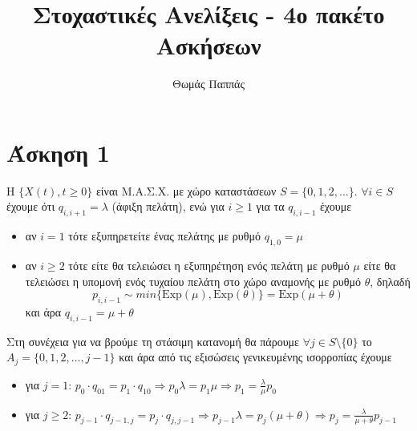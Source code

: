 \documentclass[a4paper,11pt]{article}
\newcommand{\Exp}{\mathrm{Exp}}
\newcommand{\mc}{Μ.Α.Σ.Χ. }
\begin{document}
\title{Στοχαστικές Ανελίξεις - 4ο πακέτο Ασκήσεων}
\author{Θωμάς Παππάς}
\date{}
\maketitle

\section*{Άσκηση 1}

Η $\{X(t),t\geq 0\}$ είναι \mc με χώρο καταστάσεων $S = \{0,1,2,\dots\}$.
$\forall i \in S$ έχουμε ότι $q_{i,i+1} = \lambda$ (άφιξη πελάτη), ενώ για $i \geq 1$ για τα $q_{i,i-1}$ έχουμε
\begin{itemize}
	\item αν $i=1$ τότε εξυπηρετείτε ένας πελάτης με ρυθμό $q_{1,0}=\mu$
	\item αν $i \geq 2$ τότε είτε θα τελειώσει η εξυπηρέτηση ενός πελάτη με ρυθμό $\mu$ είτε θα τελειώσει η υπομονή ενός τυχαίου πελάτη στο χώρο αναμονής με ρυθμό $\theta$, δηλαδή
	\[p_{i,i-1} \sim min\{\Exp(\mu), \Exp(\theta)\} = \Exp(\mu+\theta)\]
	και άρα $q_{i,i-1}=\mu+\theta$
\end{itemize}
\begin{center}
\end{center}
Στη συνέχεια για να βρούμε τη στάσιμη κατανομή θα πάρουμε $\forall j \in S\setminus \{0\}$ το\\
$A_j = \{0,1,2,\dots,j-1\}$ και άρα από τις εξισώσεις γενικευμένης ισορροπίας έχουμε
\begin{itemize}
	\item για $j=1$: $p_0 \cdot q_{01} = p_1 \cdot q_{10} \Rightarrow p_0 \lambda = p_1 \mu \Rightarrow p_1 = \frac{\lambda}{\mu} p_0$
	\item για $j \geq 2$: $p_{j-1} \cdot q_{j-1,j} = p_j \cdot q_{j,j-1} \Rightarrow p_{j-1} \lambda = p_j (\mu+\theta) \Rightarrow p_j = \frac{\lambda}{\mu+\theta} p_{j-1}$
\end{itemize}
\end{document}
